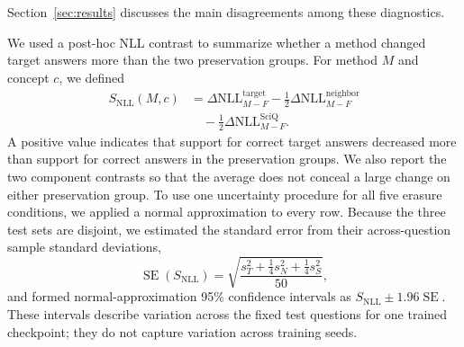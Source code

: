 Section~\ref{sec:results} discusses the main disagreements among these
diagnostics.

We used a post-hoc NLL contrast to summarize whether a method changed target
answers more than the two preservation groups. For method $M$ and concept
$c$, we defined
\begin{equation}
\begin{split}
S_{\mathrm{NLL}}(M,c)
&=\Delta\mathrm{NLL}^{\mathrm{target}}_{M-F}
-\frac{1}{2}\Delta\mathrm{NLL}^{\mathrm{neighbor}}_{M-F} \\
&\quad-\frac{1}{2}\Delta\mathrm{NLL}^{\mathrm{SciQ}}_{M-F}.
\end{split}
\end{equation}
A positive value indicates that support for correct target answers decreased
more than support for correct answers in the preservation groups. We also
report the two component contrasts so that the average does not conceal a
large change on either preservation group. To use one uncertainty procedure
for all five erasure conditions, we applied a normal approximation to every
row. Because the three test sets are disjoint, we estimated the standard error
from their across-question sample standard deviations,
\begin{equation}
\operatorname{SE}(S_{\mathrm{NLL}})
=\sqrt{\frac{s_T^2+\tfrac{1}{4}s_N^2+\tfrac{1}{4}s_S^2}{50}},
\end{equation}
and formed normal-approximation 95\% confidence intervals as
$S_{\mathrm{NLL}}\pm1.96\operatorname{SE}$. These intervals describe
variation across the fixed test questions for one trained checkpoint; they do
not capture variation across training seeds.

